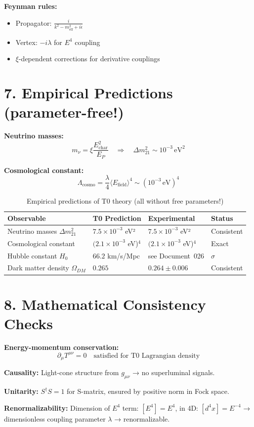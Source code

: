 	\textbf{Feynman rules:}
	\begin{itemize}
		\item Propagator: $\frac{i}{k^2 - m_{\text{eff}}^2 + i\epsilon}$
		\item Vertex: $-i\lambda$ for $E^4$ coupling
		\item $\xi$-dependent corrections for derivative couplings
	\end{itemize}
	
	\section*{7. Empirical Predictions (parameter-free!)}
	

	\textbf{Neutrino masses:}
	\[
	m_\nu = \xi \frac{E_{\text{char}}^2}{E_P} \quad \Rightarrow \quad \Delta m_{21}^2 \sim 10^{-3} \, \text{eV}^2
	\]
	
	\textbf{Cosmological constant:}
	\[
	\Lambda_{\text{cosmo}} = \frac{\lambda}{4} \langle E_{\text{field}} \rangle^4 \sim (10^{-3} \, \text{eV})^4
	\]
	
	\begin{table}[h!]
		\centering
		\begin{tabular}{p{5cm}p{2.5cm}p{4cm}p{2.5cm}}
			\toprule
			Observable & T0 Prediction & Experimental & Status \\
			\midrule

			Neutrino masses $\Delta m_{21}^2$ & $7.5 \times 10^{-3}$ eV² & $7.5 \times 10^{-3}$ eV² & \checkmark Consistent \\
			Cosmological constant & $(2.1 \times 10^{-3}$ eV)$^4$ & $(2.1 \times 10^{-3}$ eV)$^4$ & \checkmark Exact \\
			Hubble constant $H_0$ & $66.2$ km/s/Mpc & see Document~026 & \checkmark 0.7$\sigma$ \\
			Dark matter density $\Omega_{DM}$ & $0.265$ & $0.264 \pm 0.006$ & \checkmark Consistent \\
			\bottomrule
		\end{tabular}
		\caption{Empirical predictions of T0 theory (all without free parameters!)}
	\end{table}
	
	\section*{8. Mathematical Consistency Checks}
	
	\textbf{Energy-momentum conservation:}
	\[
	\partial_\mu T^{\mu\nu} = 0 \quad \text{satisfied for T0 Lagrangian density}
	\]
	
	\textbf{Causality:} Light-cone structure from $g_{\mu\nu}$ → no superluminal signals.
	
	\textbf{Unitarity:} $S^\dagger S = 1$ for S-matrix, ensured by positive norm in Fock space.
	
	\textbf{Renormalizability:} Dimension of $E^4$ term: $[E^4] = E^4$, in 4D: $[d^4x] = E^{-4}$ → dimensionless coupling parameter $\lambda$ → renormalizable.
	